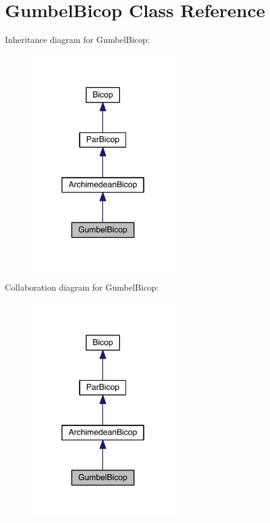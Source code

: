 \hypertarget{class_gumbel_bicop}{}\section{Gumbel\+Bicop Class Reference}
\label{class_gumbel_bicop}


Inheritance diagram for Gumbel\+Bicop\+:
\nopagebreak
\begin{figure}[H]
\begin{center}
\leavevmode
\includegraphics[width=180pt]{class_gumbel_bicop__inherit__graph}
\end{center}
\end{figure}


Collaboration diagram for Gumbel\+Bicop\+:
\nopagebreak
\begin{figure}[H]
\begin{center}
\leavevmode
\includegraphics[width=180pt]{class_gumbel_bicop__coll__graph}
\end{center}
\end{figure}
